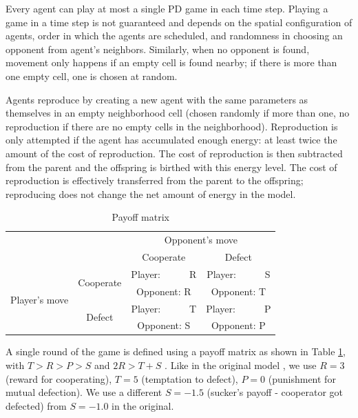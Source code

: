 \documentclass[english]{article}
\begin{document}
Every agent can play at most a single PD game in each time step.
Playing a game in a time step is not guaranteed and depends on the spatial configuration of agents, order in which the agents are scheduled, and randomness in choosing an opponent from agent's neighbors.
Similarly, when no opponent is found, movement only happens if an empty cell is found nearby; if there is more than one empty cell, one is chosen at random.

Agents reproduce by creating a new agent with the same parameters as themselves in an empty neighborhood cell (chosen randomly if more than one, no reproduction if there are no empty cells in the neighborhood).
Reproduction is only attempted if the agent has accumulated enough energy: at least twice the amount of the cost of reproduction.
The cost of reproduction is then subtracted from the parent and the offspring is birthed with this energy level.
The cost of reproduction is effectively transferred from the parent to the offspring;
reproducing does not change the net amount of energy in the model.

\begin{table}[h!]
  \centering
  \begin{tabular}{c c||c|c}
    & & \multicolumn{2}{c}{Opponent's move} \\
    & & Cooperate & Defect \\
    \hline\hline

    \multirow{4}{6em}{Player's move}
    & \multirow{2}{5em}{Cooperate}
      & Player:\ \ \ \ \ \ R & Player:\ \ \ \ \ \ S \\
    & & Opponent: R & Opponent: T \\
    \cline{2-4}
    & \multirow{2}{5em}{Defect}
      & Player:\ \ \ \ \ \ T & Player:\ \ \ \ \ \ P \\
    & & Opponent: S & Opponent: P \\
  \end{tabular}

  \caption{Payoff matrix}
  \label{table:payoff}
\end{table}

A single round of the game is defined using a payoff matrix as shown in Table \ref{table:payoff}, with $T > R > P > S$ and $2R > T + S$ \citep{chammah1965}.
Like in the original model \citep{smaldino},
we use $R = 3$ (reward for cooperating),
$T = 5$ (temptation to defect),
$P = 0$ (punishment for mutual defection).
We use a different $S = -1.5$ (sucker's payoff - cooperator got defected) from $S = -1.0$ in the original.
\end{document}
